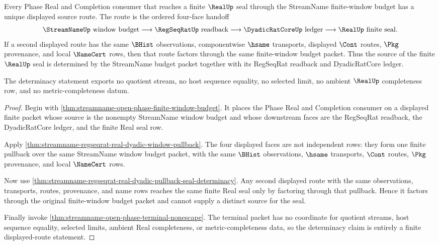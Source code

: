 \begin{theorem}
\label{thm:streamname-open-phase-budget-source-determinacy}
Every Phase Real and Completion consumer that reaches a finite $\RealUp$ seal through the StreamName finite-window budget has a unique displayed source route. The route is the ordered four-face handoff
$$
\StreamNameUp\text{ window budget}\longrightarrow \RegSeqRatUp\text{ readback}\longrightarrow \DyadicRatCoreUp\text{ ledger}\longrightarrow \RealUp\text{ finite seal}.
$$
If a second displayed route has the same $\BHist$ observations, componentwise $\hsame$ transports, displayed $\Cont$ routes, $\Pkg$ provenance, and local $\NameCert$ rows, then that route factors through the same finite-window budget packet. Thus the source of the finite $\RealUp$ seal is determined by the StreamName budget packet together with its RegSeqRat readback and DyadicRatCore ledger.

The determinacy statement exports no quotient stream, no host sequence equality, no selected limit, no ambient $\RealUp$ completeness row, and no metric-completeness datum.
\end{theorem}
\begin{proof}
Begin with \autoref{thm:streamname-open-phase-finite-window-budget}. It places the Phase Real and Completion consumer on a displayed finite packet whose source is the nonempty StreamName window budget and whose downstream faces are the RegSeqRat readback, the DyadicRatCore ledger, and the finite Real seal row.

Apply \autoref{thm:streamname-regseqrat-real-dyadic-window-pullback}. The four displayed faces are not independent rows: they form one finite pullback over the same StreamName window budget packet, with the same $\BHist$ observations, $\hsame$ transports, $\Cont$ routes, $\Pkg$ provenance, and local $\NameCert$ rows.

Now use \autoref{thm:streamname-regseqrat-real-dyadic-pullback-seal-determinacy}. Any second displayed route with the same observations, transports, routes, provenance, and name rows reaches the same finite Real seal only by factoring through that pullback. Hence it factors through the original finite-window budget packet and cannot supply a distinct source for the seal.

Finally invoke \autoref{thm:streamname-open-phase-terminal-nonescape}. The terminal packet has no coordinate for quotient streams, host sequence equality, selected limits, ambient Real completeness, or metric-completeness data, so the determinacy claim is entirely a finite displayed-route statement.
\end{proof}

